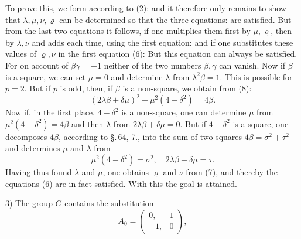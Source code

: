 To prove this, we form according to (2):
and it therefore only remains to show that $\lambda,\mu,\nu,\varrho$ can be determined so that the three equations:
are satisfied. But from the last two equations it follows, if one multiplies them first by $\mu,\varrho$, then by $\lambda,\nu$ and adds each time, using the first equation:
and if one substitutes these values of $\varrho,\nu$ in the first equation (6):
But this equation can always be satisfied. For on account of $\beta\gamma=-1$ neither of the two numbers $\beta,\gamma$ can vanish. Now if $\beta$ is a square, we can set $\mu=0$ and determine $\lambda$ from $\lambda^2\beta=1$. This is  possible for $p=2$. But if $p$ is odd, then, if $\beta$ is a non-square, we obtain from (8):
\[
(2\lambda\beta+\delta\mu)^2+\mu^2(4-\delta^2) = 4\beta.
\]
Now if, in the first place, $4-\delta^2$ is a non-square, one can determine $\mu$ from $\mu^2(4-\delta^2)=4\beta$ and then $\lambda$ from $2\lambda\beta+\delta\mu=0$. But if $4-\delta^2$ is a square, one decomposes $4\beta$, according to \S.\,64, 7., into the sum of two squares $4\beta=\sigma^2+\tau^2$ and determines $\mu$ and $\lambda$ from
\[
\mu^2(4-\delta^2) = \sigma^2, \quad 2\lambda\beta+\delta\mu = \tau.
\]
Having thus found $\lambda$ and $\mu$, one obtains $\varrho$ and $\nu$ from (7), and thereby the equations (6) are in fact satisfied. With this the goal is attained.

3) The group $G$ contains the substitution
\[
A_0 = \begin{pmatrix} 0, & 1 \\ -1, & 0 \end{pmatrix},
\]
